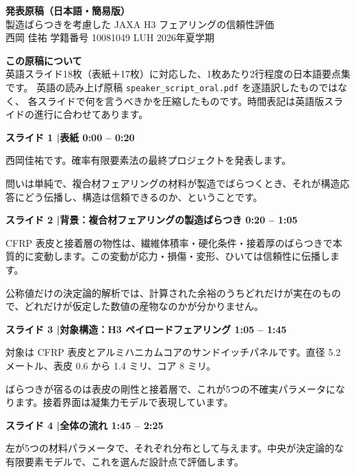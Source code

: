 \documentclass[11pt,a4paper]{ltjsarticle}
\newcommand{\slide}[3]{%
  \medskip
  \noindent\colorbox{luhblue}{\parbox{\dimexpr\linewidth-2\fboxsep}{%
    \color{white}\bfseries\small スライド #1 \quad|\quad #2 \hfill #3}}\par
  \nopagebreak\vspace{0.25em}}
\begin{document}
\begin{center}
{\LARGE\bfseries 発表原稿（日本語・簡易版）}\\[0.4em]
{\large 製造ばらつきを考慮した JAXA H3 フェアリングの信頼性評価}\\[0.3em]
{\normalsize 西岡 佳祐 \quad 学籍番号 10081049 \quad LUH 2026年夏学期}
\end{center}

\vspace{0.4em}
\begin{tcolorbox}[colback=soft,colframe=luhblue,boxrule=0.6pt,arc=2pt]
{\bfseries この原稿について}\\[0.3em]
英語スライド18枚（表紙＋17枚）に対応した、1枚あたり2行程度の日本語要点集です。
英語の読み上げ原稿 \texttt{speaker\_script\_oral.pdf} を逐語訳したものではなく、
各スライドで何を言うべきかを圧縮したものです。時間表記は英語版スライドの進行に合わせてあります。
\end{tcolorbox}

\slide{1}{表紙}{0:00 -- 0:20}

西岡佳祐です。確率有限要素法の最終プロジェクトを発表します。

問いは単純で、複合材フェアリングの材料が製造でばらつくとき、それが構造応答にどう伝播し、構造は信頼できるのか、ということです。

\slide{2}{背景：複合材フェアリングの製造ばらつき}{0:20 -- 1:05}

CFRP 表皮と接着層の物性は、繊維体積率・硬化条件・接着厚のばらつきで本質的に変動します。この変動が応力・損傷・変形、ひいては信頼性に伝播します。

公称値だけの決定論的解析では、計算された余裕のうちどれだけが実在のもので、どれだけが仮定した数値の産物なのかが分かりません。

\slide{3}{対象構造：H3 ペイロードフェアリング}{1:05 -- 1:45}

対象は CFRP 表皮とアルミハニカムコアのサンドイッチパネルです。直径 5.2 メートル、表皮 0.6 から 1.4 ミリ、コア 8 ミリ。

ばらつきが宿るのは表皮の剛性と接着層で、これが5つの不確実パラメータになります。接着界面は凝集力モデルで表現しています。

\slide{4}{全体の流れ}{1:45 -- 2:25}

左が5つの材料パラメータで、それぞれ分布として与えます。中央が決定論的な有限要素モデルで、これを選んだ設計点で評価します。
\end{document}
